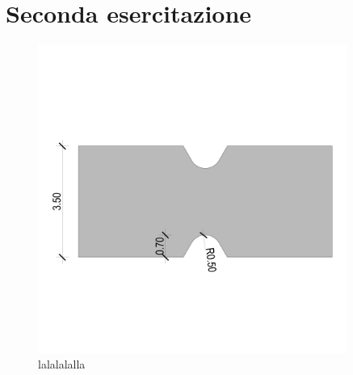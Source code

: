 \chapter{Seconda esercitazione}
\begin{figure}[htb]
    \centering
    \includegraphics[width=0.9\textwidth]{rel2/img2/2Lastra.pdf}
    \caption{lalalalalla}
    \label{fig:lastra}
\end{figure}